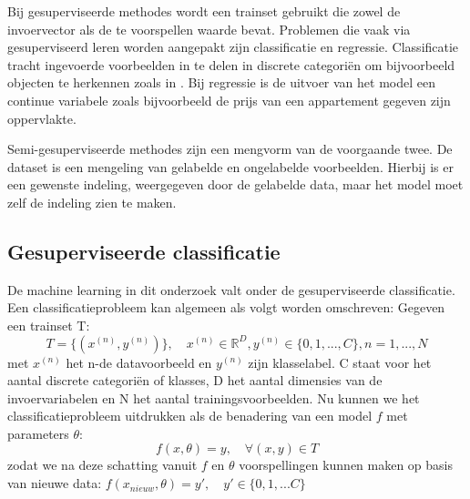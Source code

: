 \npar Bij gesuperviseerde methodes wordt een trainset gebruikt die zowel de invoervector als de te voorspellen waarde bevat. Problemen die vaak via gesuperviseerd leren worden aangepakt zijn classificatie en regressie. Classificatie tracht ingevoerde voorbeelden in te delen in discrete categori\"en om bijvoorbeeld objecten te herkennen zoals in \cite{cnn-krizhevsky}. Bij regressie is de uitvoer van het model een continue variabele zoals bijvoorbeeld de prijs van een appartement gegeven zijn oppervlakte.

\npar Semi-gesuperviseerde methodes zijn een mengvorm van de voorgaande twee. De dataset is een mengeling van gelabelde en ongelabelde voorbeelden. Hierbij is er een gewenste indeling, weergegeven door de gelabelde data, maar het model moet zelf de indeling zien te maken.


\subsection{Gesuperviseerde classificatie}

\npar De machine learning in dit onderzoek valt onder de gesuperviseerde classificatie. Een classificatieprobleem kan algemeen als volgt worden omschreven:
\npar Gegeven een trainset T:
\begin{equation}
T = \{ ( x^{(n)}, y^{(n)})\},\quad x^{(n)}\in\mathbb{R}^D, y^{(n)}\in\{0,1,...,C\}, n=1,...,N
\end{equation}
met $x^{(n)}$ het n-de datavoorbeeld en $y^{(n)}$ zijn klasselabel. C staat voor het aantal discrete categori\"en of klasses, D het aantal dimensies van de invoervariabelen en N het aantal trainingsvoorbeelden. Nu kunnen we het classificatieprobleem uitdrukken als de benadering van een model $f$ met parameters $\theta$:
\begin{equation}\label{eq:classifier}
f(x,\theta) = y,\quad\forall(x,y) \in T
\end{equation}
zodat we na deze schatting vanuit $f$ en $\theta$ voorspellingen kunnen maken op basis van nieuwe data: $f(x_{nieuw},\theta)=y', \quad y' \in\{0,1,...C\}$

